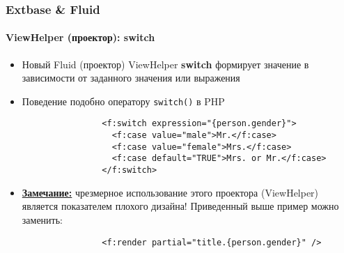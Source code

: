 \begin{frame}[fragile]
	\frametitle{Extbase \& Fluid}
	\framesubtitle{ViewHelper (проектор): switch}

	\lstset{
		basicstyle=\smaller\ttfamily
	}

	\begin{itemize}
		\item Новый Fluid (проектор) ViewHelper \textbf{switch} формирует значение в зависимости от заданного значения или
		выражения
		\item Поведение подобно оператору \texttt{switch()} в PHP

			\begin{lstlisting}
				<f:switch expression="{person.gender}">
				  <f:case value="male">Mr.</f:case>
				  <f:case value="female">Mrs.</f:case>
				  <f:case default="TRUE">Mrs. or Mr.</f:case>
				</f:switch>
			\end{lstlisting}

		\item \textbf{\underline{Замечание:}} чрезмерное использование этого проектора (ViewHelper) является показателем
		плохого дизайна! Приведенный выше пример можно заменить:

			\begin{lstlisting}
				<f:render partial="title.{person.gender}" />
			\end{lstlisting}

	\end{itemize}

\end{frame}


